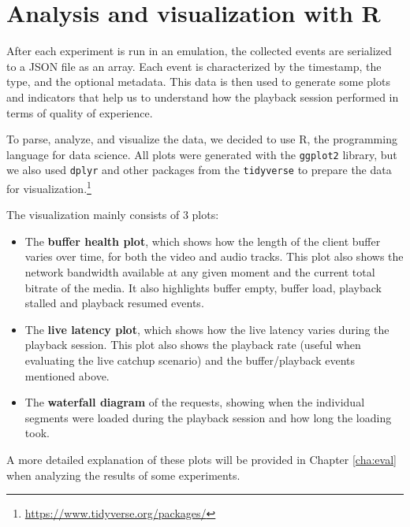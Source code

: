 \section{Analysis and visualization with R}
\label{sec:testbed/dataviz}

After each experiment is run in an emulation, the collected events are serialized to a JSON file as an array. Each event is characterized by the timestamp, the type, and the optional metadata. This data is then used to generate some plots and indicators that help us to understand how the playback session performed in terms of quality of experience.

To parse, analyze, and visualize the data, we decided to use R, the programming language for data science. All plots were generated with the \texttt{ggplot2} library, but we also used \texttt{dplyr} and other packages from the \texttt{tidyverse} to prepare the data for visualization.\footnote{\url{https://www.tidyverse.org/packages/}}

The visualization mainly consists of 3 plots:

\begin{itemize}
    \item The \textbf{buffer health plot}, which shows how the length of the client buffer varies over time, for both the video and audio tracks. This plot also shows the network bandwidth available at any given moment and the current total bitrate of the media. It also highlights buffer empty, buffer load, playback stalled and playback resumed events.
    \item The \textbf{live latency plot}, which shows how the live latency varies during the playback session. This plot also shows the playback rate (useful when evaluating the live catchup scenario) and the buffer/playback events mentioned above.
    \item The \textbf{waterfall diagram} of the requests, showing when the individual segments were loaded during the playback session and how long the loading took.
\end{itemize}

A more detailed explanation of these plots will be provided in Chapter \ref{cha:eval} when analyzing the results of some experiments.

